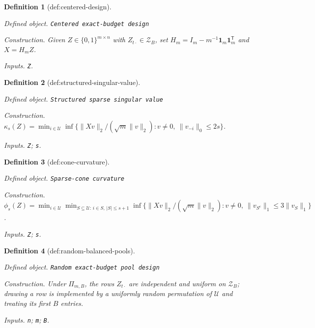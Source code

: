 \documentclass{article}
\newtheorem{definition}{Definition}
\begin{document}
\begin{definition}[def:centered-design]\label{def:centered-design}
\par\smallskip\noindent\emph{Defined object.} \texttt{Centered exact-\allowbreak{}budget design}
\par\smallskip\noindent\emph{Construction.} Given \(Z\in\{0,1\}^{m\times n}\) with \(Z_{t\cdot}\in\mathcal Z_B\), set \(H_m=I_m-m^{-1}\mathbf 1_m\mathbf 1_m^{\mathsf T}\) and \(X=H_mZ\).
\par\smallskip\noindent\emph{Inputs.} \texttt{Z}.
\end{definition}

\begin{definition}[def:structured-singular-value]\label{def:structured-singular-value}
\par\smallskip\noindent\emph{Defined object.} \texttt{Structured sparse singular value}
\par\smallskip\noindent\emph{Construction.} \(\kappa_s(Z)=\min_{i\in\mathcal U}\inf\{\lVert Xv\rVert_2/(\sqrt m\lVert v\rVert_2):v\ne0,\ \lVert v_{-i}\rVert_0\le2s\}\).
\par\smallskip\noindent\emph{Inputs.} \texttt{Z}; \texttt{s}.
\end{definition}

\begin{definition}[def:cone-curvature]\label{def:cone-curvature}
\par\smallskip\noindent\emph{Defined object.} \texttt{Sparse-\allowbreak{}cone curvature}
\par\smallskip\noindent\emph{Construction.} \(\phi_s(Z)=\min_{i\in\mathcal U}\min_{S\subseteq\mathcal U:\,i\in S,\,|S|\le s+1}\inf\{\lVert Xv\rVert_2/(\sqrt m\lVert v\rVert_2):v\ne0,\ \lVert v_{S^c}\rVert_1\le3\lVert v_S\rVert_1\}\).
\par\smallskip\noindent\emph{Inputs.} \texttt{Z}; \texttt{s}.
\end{definition}

\begin{definition}[def:random-balanced-pools]\label{def:random-balanced-pools}
\par\smallskip\noindent\emph{Defined object.} \texttt{Random exact-\allowbreak{}budget pool design}
\par\smallskip\noindent\emph{Construction.} Under \(\Pi_{m,B}\), the rows \(Z_{t\cdot}\) are independent and uniform on \(\mathcal Z_B\); drawing a row is implemented by a uniformly random permutation of \(\mathcal U\) and treating its first \(B\) entries.
\par\smallskip\noindent\emph{Inputs.} \texttt{n}; \texttt{m}; \texttt{B}.
\end{definition}
\end{document}
